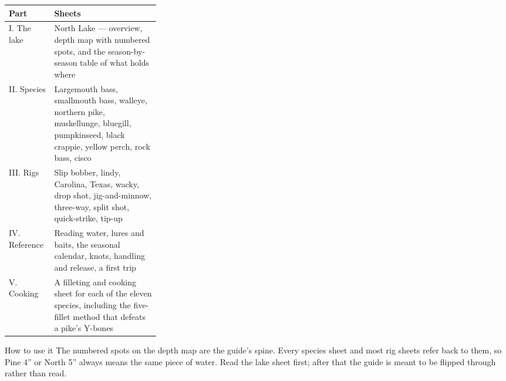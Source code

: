 \begin{tabularx}{\linewidth}{@{}p{0.30\linewidth}L@{}}
\toprule
\textbf{Part} & \textbf{Sheets}\\
\midrule
I. The lake & North Lake --- overview, depth map with numbered spots, and the
  season-by-season table of what holds where\\
II. Species & Largemouth bass, smallmouth bass, walleye, northern pike,
  muskellunge, bluegill, pumpkinseed, black crappie, yellow perch, rock bass,
  cisco\\
III. Rigs & Slip bobber, lindy, Carolina, Texas, wacky, drop shot,
  jig-and-minnow, three-way, split shot, quick-strike, tip-up\\
IV. Reference & Reading water, lures and baits, the seasonal calendar,
  knots, handling and release, a first trip\\
V. Cooking & A filleting and cooking sheet for each of the eleven species,
  including the five-fillet method that defeats a pike's Y-bones\\
\bottomrule
\end{tabularx}

\vspace{1.2em}
\begin{telospanel}{How to use it}
The numbered spots on the depth map are the guide's spine. Every species sheet
and most rig sheets refer back to them, so Pine 4'' or North 5'' always
means the same piece of water. Read the lake sheet first; after that the guide
is meant to be flipped through rather than read.
\end{telospanel}



